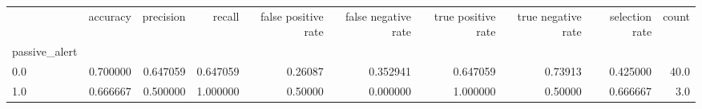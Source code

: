 \begin{tabular}{lrrrrrrrrr}
\toprule
{} &  accuracy &  precision &    recall &  false positive rate &  false negative rate &  true positive rate &  true negative rate &  selection rate &  count \\
passive\_alert &           &            &           &                      &                      &                     &                     &                 &        \\
\midrule
0.0           &  0.700000 &   0.647059 &  0.647059 &              0.26087 &             0.352941 &            0.647059 &             0.73913 &        0.425000 &   40.0 \\
1.0           &  0.666667 &   0.500000 &  1.000000 &              0.50000 &             0.000000 &            1.000000 &             0.50000 &        0.666667 &    3.0 \\
\bottomrule
\end{tabular}
